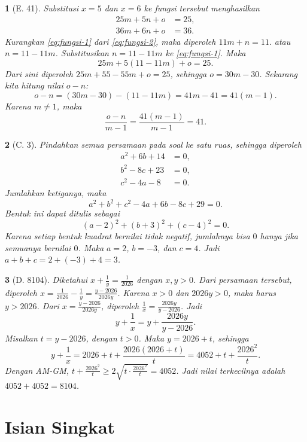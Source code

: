\documentclass[11pt,a4paper,DIV=12]{scrartcl}
\theoremstyle{problemstyle}
\theoremstyle{answerstyle}
\newtheorem{answer}{}
\begin{document}
\begin{answer}[E. 41]
  Substitusi $x=5$ dan $x=6$ ke fungsi tersebut menghasilkan
  \begin{align}
    25m+5n+o & = 25, \label{eq:fungsi-1} \\
    36m+6n+o & = 36. \label{eq:fungsi-2}
  \end{align}
  Kurangkan \eqref{eq:fungsi-1} dari \eqref{eq:fungsi-2}, maka diperoleh
  $
    11m+n=11.
  $
  atau $n=11-11m$.
  Substitusikan $n=11-11m$ ke \eqref{eq:fungsi-1}. Maka
  \[
    25m+5(11-11m)+o=25.
  \]
  Dari sini diperoleh $25m+55-55m+o=25$, sehingga $o=30m-30$.
  Sekarang kita hitung nilai $o-n$:
  \[
    o-n=(30m-30)-(11-11m)=41m-41=41(m-1).
  \]
  Karena $m\neq 1$, maka
  \[
    \frac{o-n}{m-1}=\frac{41(m-1)}{m-1}=\boxed{41}.
  \]
\end{answer}

\begin{answer}[C. 3]
  Pindahkan semua persamaan pada soal ke satu ruas, sehingga diperoleh
  \begin{align*}
    a^2+6b+14 & = 0, \\
    b^2-8c+23 & = 0, \\
    c^2-4a-8  & = 0.
  \end{align*}
  Jumlahkan ketiganya, maka
  \[
    a^2+b^2+c^2-4a+6b-8c+29=0.
  \]
  Bentuk ini dapat ditulis sebagai
  \[
    (a-2)^2+(b+3)^2+(c-4)^2=0.
  \]
  Karena setiap bentuk kuadrat bernilai tidak negatif, jumlahnya bisa $0$ hanya jika semuanya bernilai $0$. Maka $a=2$, $b=-3$, dan $c=4$. Jadi $a+b+c=2+(-3)+4=\boxed{3}$.
\end{answer}

\begin{answer}[D. 8104]
  Diketahui $x+\frac{1}{y}=\frac{1}{2026}$ dengan $x,y>0$. Dari persamaan tersebut, diperoleh $x=\frac{1}{2026}-\frac{1}{y}=\frac{y-2026}{2026y}$. Karena $x>0$ dan $2026y>0$, maka harus $y>2026$.
  Dari $x=\frac{y-2026}{2026y}$, diperoleh $\frac{1}{x}=\frac{2026y}{y-2026}$. Jadi
  \[
    y+\frac{1}{x}=y+\frac{2026y}{y-2026}.
  \]
  Misalkan $t=y-2026$, dengan $t>0$. Maka $y=2026+t$, sehingga
  \[
    y+\frac{1}{x}=2026+t+\frac{2026(2026+t)}{t}=4052+t+\frac{2026^2}{t}.
  \]
  Dengan AM-GM, $t+\frac{2026^2}{t}\geq 2\sqrt{t\cdot \frac{2026^2}{t}}=4052$. Jadi nilai terkecilnya adalah $4052+4052=\boxed{8104}$.
\end{answer}

\section*{Isian Singkat}
\end{document}
